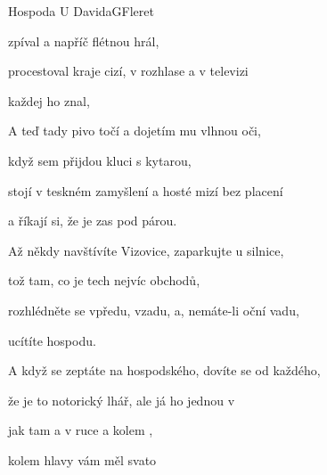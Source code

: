 \begin{song}{Hospoda U Davida}{G}{Fleret}
\begin{SBChorus}
zpíval a napříč flétnou hrál,

procestoval kraje cizí, v rozhlase a v televizi

každej ho znal,

A teď tady pivo točí a dojetím mu vlhnou oči,

když sem přijdou kluci s kytarou,

stojí v teskném zamyšlení a hosté mizí bez placení

a říkají si, že je zas pod párou.
\end{SBChorus}
\begin{SBVerse}
Až někdy navštívíte Vizovice, zaparkujte u silnice,

tož tam, co je tech nejvíc obchodů,

rozhlédněte se vpředu, vzadu, a, nemáte-li oční vadu,

ucítíte hospodu.

A když se zeptáte na hospodského, dovíte se od každého,

že je to notorický lhář, ale já ho  jednou v 

jak tam  a v ruce  a kolem , 

kolem hlavy vám měl svato
\end{SBVerse}
\end{song}

